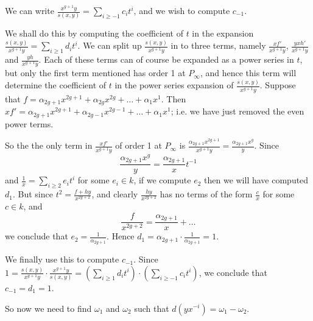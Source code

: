 \documentclass[draft, 11pt]{article} %
\theoremstyle{plain}
\theoremstyle{remark}
\begin{document}
We can write $\frac{x^{g+1}y}{s(x,y)} = \sum_{i\geq -1} c_i t^i$, and we wish to compute $c_{-1}$.

We shall do this by computing the coefficient of $t$ in the expansion $\frac{s(x,y)}{x^{g+1}y} = \sum_{i\geq 1}d_it^i$.
We can split up $\frac{s(x,y)}{x^{g+1}y}$ in to three terms, namely $\frac{xf'}{x^{g+1}y}$, $\frac{yxh'}{x^{g+1}y}$ and $\frac{yh}{x^{g+1}y}$.
Each of these terms can of course be expanded as a power series in $t$, but only the first term mentioned has order 1 at $P_\infty$, and hence this term will determine the coefficient of $t$ in the power series expansion of $\frac{s(x,y)}{x^{g+1}y}$.
Suppose that $f = \alpha_{2g+1}x^{2g+1} + \alpha_{2g}x^{2g} + \ldots + \alpha_1x^1$.
Then $xf'= \alpha_{2g+1}x^{2g+1} + \alpha_{2g-1}x^{2g-1} + \ldots + \alpha_1x^1$; i.e. we have just removed the even power terms.

So the the only term in $\frac{xf'}{x^{g+1}y}$ of order 1 at $P_\infty$ is $\frac{\alpha_{2g+1}x^{2g+1}}{x^{g+1}y} = \frac{\alpha_{2g+1}x^{g}}{y}$.
Since
\[
\frac{\alpha_{2g+1}x^g}{y} = \frac{\alpha_{2g+1}}{x}t^{-1}
\]
and $\frac{1}{x} = \sum_{i\geq 2}e_it^i$ for some $e_i \in k$, if we compute $e_2$ then we will have computed $d_1$.
But since $t^2 = \frac{f + hy}{x^{2g+2}}$, and clearly $\frac{hy}{x^{2g+2}}$ has no terms of the form $\frac{c}{x}$ for some $c \in k$, and 
\[
\frac{f}{x^{2g+2}} = \frac{\alpha_{2g+1}}{x} + \ldots
\]
we conclude that $e_2 = \frac{1}{\alpha_{2g+1}}$.
Hence $d_1 = \alpha_{2g+1} \cdot \frac{1}{\alpha_{2g+1}} = 1$.


We finally use this to compute $c_{-1}$.
Since $1 = \frac{s(x,y)}{x^{g+1}y}\cdot \frac{x^{g+1}y}{s(x,y)} = \left( \sum_{i\geq 1}d_it^i \right) \cdot \left( \sum_{i\geq -1}c_it^i\right)$, we conclude that $c_{-1} = d_{1} = 1$.


So now we need to find $\omega_1$ and $\omega_2$ such that $d(yx^{-i}) = \omega_1 - \omega_2$.




%

\end{document}
